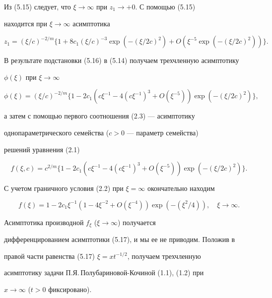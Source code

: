 Из (5.15) следует, что $\xi\to\infty$ при $z_1\to+0$. С помощью (5.15) 


находится при $\xi\to\infty$ асимптотика 


\begin{equation} 


z_1=(\xi/c)^{-2/m}\{1+8c_1(\xi/c)^{-3}\exp(-(\xi/2c)^2)+ 


O(\xi^{-5}\exp(-(\xi/2c)^2))\}. 


\end{equation} 


В результате подстановки (5.16) в (5.14) получаем трехчленную асимптотику 


$\phi(\xi)$ при $\xi\to\infty$ 


$$ 


\phi(\xi)=(\xi/c)^{-2/m}\{1-2c_1(c\xi^{-1}-4(c\xi^{-1})^3+ 


O(\xi^{-5}))\exp(-(\xi/2c)^2)\}, 


$$ 


а затем с помощью первого соотношения (2.3) --- асимптотику 


однопараметрического семейства ($c>0$ --- параметр семейства) 


решений уравнения (2.1) 


$$ 


f(\xi,c)=c^{2/m}\{1-2c_1(c\xi^{-1}-4(c\xi^{-1})^3+ 


O(\xi^{-5}))\exp(-(\xi/2c)^2)\}. 


$$ 


С учетом граничного условия (2.2) при $\xi=\infty$ окончательно находим 


\begin{equation} 


f(\xi)=1-2c_1\xi^{-1}(1-4\xi^{-2}+O(\xi^{-4})) 


\exp(-(\xi^2/4)),\quad \xi\to\infty. 


\end{equation} 


Асимптотика производной $f_\xi$ ($\xi\to\infty$) получается 


дифференцированием асимптотики (5.17), и мы ее не приводим. Положив в 


правой части равенства (5.17) $\xi=x t^{-1/2}$, получаем трехчленную 


асимптотику задачи П.Я.\,Полубариновой-Кочиной (1.1), (1.2) при 


$x\to\infty$ ($t>0$ фиксировано). 


